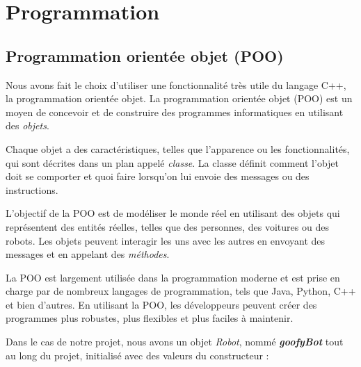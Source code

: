 \section{Programmation}

\subsection{Programmation orientée objet (POO)}

Nous avons fait le choix d'utiliser une fonctionnalité très utile du langage C++, la programmation orientée objet. La programmation orientée objet (POO) est un moyen de concevoir et de construire des programmes informatiques en utilisant des \emph{objets}.

Chaque objet a des caractéristiques, telles que l'apparence ou les fonctionnalités, qui sont décrites dans un plan appelé \emph{classe}. La classe définit comment l'objet doit se comporter et quoi faire lorsqu'on lui envoie des messages ou des instructions.

L'objectif de la POO est de modéliser le monde réel en utilisant des objets qui représentent des entités réelles, telles que des personnes, des voitures ou des robots. Les objets peuvent interagir les uns avec les autres en envoyant des messages et en appelant des \emph{méthodes}.

La POO est largement utilisée dans la programmation moderne et est prise en charge par de nombreux langages de programmation, tels que Java, Python, C++ et bien d'autres. En utilisant la POO, les développeurs peuvent créer des programmes plus robustes, plus flexibles et plus faciles à maintenir.

\noindent Dans le cas de notre projet, nous avons un objet \emph{Robot}, nommé \textbf{\textit{goofyBot}} tout au long du projet, initialisé avec des valeurs du constructeur :

